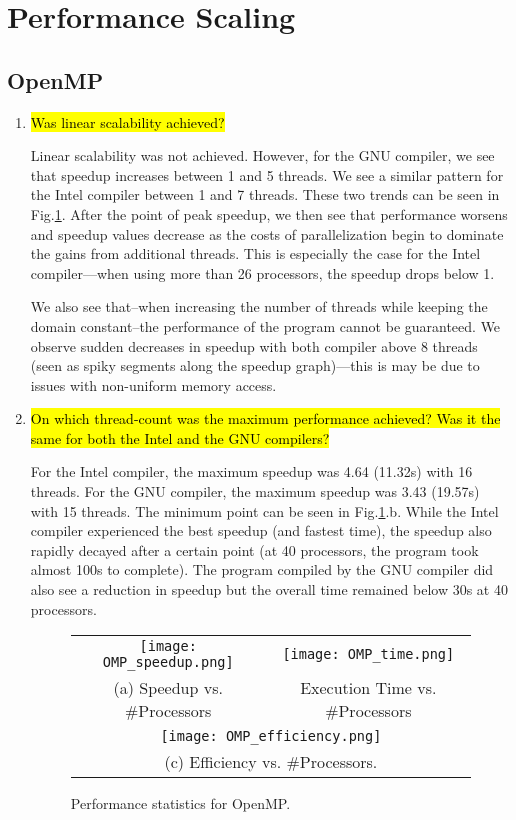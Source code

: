 \documentclass{article}
\begin{document}
\section{Performance Scaling}
\subsection{OpenMP}
\begin{enumerate}
	\item \hl{Was linear scalability achieved?}

	Linear scalability was not achieved. However, for the GNU compiler, we see that speedup increases between 1 and 5 threads. We see a similar pattern for the Intel compiler between 1 and 7 threads. These two trends can be seen in Fig.\ref{fig:omp_performance}. After the point of peak speedup, we then see that performance worsens and speedup values decrease as the costs of parallelization begin to dominate the gains from additional threads. This is especially the case for the Intel compiler---when using more than 26 processors, the speedup drops below 1.

	We also see that--when increasing the number of threads while keeping the domain constant--the performance of the program cannot be guaranteed. We observe sudden decreases in speedup with both compiler above 8 threads (seen as spiky segments along the speedup graph)---this is may be due to issues with non-uniform memory access.
	\vspace{1mm}

	\item \hl{On which thread-count was the maximum performance achieved? Was it the same for both the Intel and the GNU compilers?}

	For the Intel compiler, the maximum speedup was 4.64 (11.32s) with 16 threads. For the GNU compiler, the maximum speedup was 3.43 (19.57s) with 15 threads. The minimum point can be seen in Fig.\ref{fig:omp_performance}.b. While the Intel compiler experienced the best speedup (and fastest time), the speedup also rapidly decayed after a certain point (at 40 processors, the program took almost 100s to complete). The program compiled by the GNU compiler did also see a reduction in speedup but the overall time remained below 30s at 40 processors.

	\begin{figure}[p] %
		\hspace*{-0.25\linewidth}\begin{tabular}{cc}
			\texttt{[image: OMP\_speedup.png]} & \texttt{[image: OMP\_time.png]} \\
			(a) Speedup vs. \#Processors & Execution Time vs. \#Processors\\[6pt]
			\multicolumn{2}{c}{\texttt{[image: OMP\_efficiency.png]}}\\
			\multicolumn{2}{c}{(c) Efficiency vs. \#Processors.}
		\end{tabular}
		\caption{Performance statistics for OpenMP.}
		\label{fig:omp_performance}
	\end{figure}

\end{enumerate}
\end{document}
